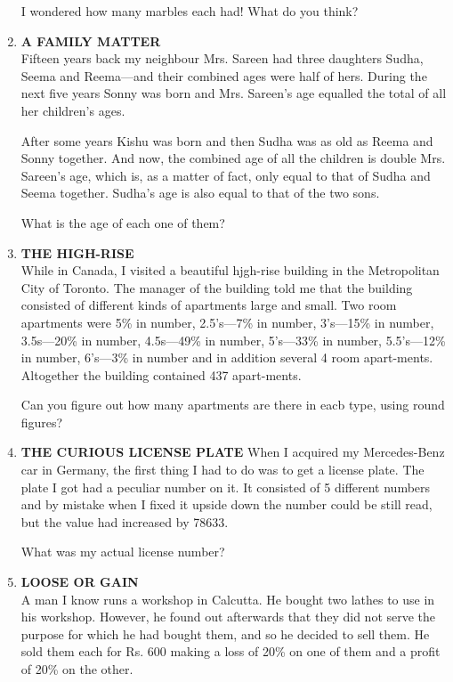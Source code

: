 \documentclass[12pt]{article}
\begin{document}
\begin{enumerate}
I wondered  how  many  marbles  each  had!  What  do you think? 
%
\item \textbf{A FAMILY  MATTER} \\
Fifteen  years  back  my neighbour  Mrs.  Sareen  had  three daughters  Sudha,  Seema  and Reema—and  their  combined ages were  half of hers.  During  the  next  five years  Sonny was born  and Mrs.  Sareen's  age equalled  the total  of all her children's  ages. 

After  some  years  Kishu  was  born  and then  Sudha  was as old  as Reema  and  Sonny  together.  And  now,  the combined  age of all the children  is double  Mrs.  Sareen's age, which  is, as a matter  of fact,  only  equal  to that  of Sudha  and Seema  together.  Sudha's  age is also  equal  to that of the two sons. 

What  is the age of each  one of them? 
%
\item \textbf{THE  HIGH-RISE} \\
While  in Canada,  I visited  a beautiful  hjgh-rise  building in the  Metropolitan  City  of Toronto.  The  manager of the  building  told  me  that  the  building  consisted  of different  kinds  of apartments  large  and small.  Two  room apartments  were  5\%  in number,  2.5's—7\%  in number, 3's—15\%  in number,  3.5s—20\%  in number,  4.5s—49\% in number,  5's—33\%  in number,  5.5's—12\%  in number, 6's—3\%  in number  and in addition  several  4 room  apart-ments.  Altogether  the  building  contained  437  apart-ments. 

Can you  figure  out how  many  apartments  are there  in eacb type,  using  round  figures? 
%
\item \textbf{THE  CURIOUS  LICENSE  PLATE}
When  I acquired  my Mercedes-Benz  car in Germany,  the first thing  I had  to do was  to get a license  plate.  The plate  I got had a peculiar  number  on it. It consisted  of 5 different  numbers  and by mistake  when  I fixed  it upside down  the number  could  be still read,  but  the  value  had increased  by 78633. 

What  was  my actual  license  number? 
%
\item \textbf{LOOSE  OR GAIN} \\ 
A man  I know  runs  a workshop  in Calcutta.  He  bought two lathes  to use  in his workshop.  However,  he found out afterwards  that  they  did  not  serve  the purpose  for which  he had  bought  them,  and  so he decided  to sell them.  He  sold  them  each  for  Rs. 600 making  a loss of 20\%  on one  of them  and  a profit  of 20\%  on the other. 


\end{enumerate}
\end{document}
